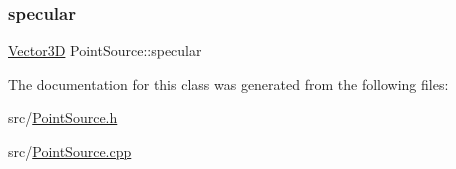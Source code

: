 \subsubsection{\texorpdfstring{specular}{specular}}
{\footnotesize\ttfamily \mbox{\hyperlink{classVector3D}{Vector3D}} Point\+Source\+::specular\hspace{0.3cm}{\ttfamily [private]}}



The documentation for this class was generated from the following files\+:\begin{DoxyCompactItemize}
\item 
src/\mbox{\hyperlink{PointSource_8h}{Point\+Source.\+h}}\item 
src/\mbox{\hyperlink{PointSource_8cpp}{Point\+Source.\+cpp}}\end{DoxyCompactItemize}
